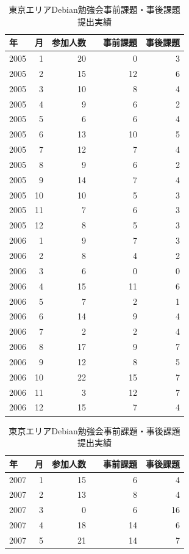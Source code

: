 \documentclass[mingoth,a4paper]{jsarticle}
\begin{document}
\begin{commandline}
\begin{table}[ht]
 \caption{東京エリアDebian勉強会事前課題・事後課題提出実績}\label{tab:attendandprepostwork}
\begin{minipage}{0.5\hsize}
\begin{tabular}{|l|r|r|r|r|}
 \hline
   年&月 & 参加人数 & 事前課題　& 事後課題 \\
 \hline
 2005 & 1 & 20 & 0 & 3 \\
 2005 & 2 & 15 & 12 & 6 \\
 2005 & 3 & 10 & 8 & 4 \\
 2005 & 4 & 9 & 6 & 2 \\
 2005 & 5 & 6 & 6 & 4\\
 2005 & 6 & 13 & 10 & 5\\
 2005 & 7 & 12 & 7 & 4\\
 2005 & 8 & 9 & 6 & 2\\
 2005 & 9 & 14 & 7 & 4\\
 2005 & 10 & 10 & 5 & 3\\
 2005 & 11 & 7 & 6 & 3\\
 2005 & 12 & 8 & 5 & 3\\
 2006 & 1 & 9 & 7 & 3\\
 2006 & 2 & 8 & 4 & 2\\
 2006 & 3 & 6 & 0 & 0\\
 2006 & 4 & 15 & 11 & 6\\
 2006 & 5 & 7 & 2 & 1\\
 2006 & 6 & 14 & 9 & 4\\
 2006 & 7 & 2 & 2 & 4\\
 2006 & 8 & 17 & 9 & 7\\
 2006 & 9 & 12 & 8 & 5\\
 2006 & 10 & 22 & 15 & 7\\
 2006 & 11 & 3 & 12 & 7\\
 2006 & 12 & 15 & 7 & 4\\
\end{tabular}
\end{minipage}
\begin{minipage}{0.5\hsize}
\begin{tabular}{|l|r|r|r|r|}
 \hline
   年&月 & 参加人数 & 事前課題　& 事後課題 \\
 \hline
 2007 & 1 & 15 & 6 & 4\\
 2007 & 2 & 13 & 8 & 4\\
 2007 & 3 & 0 & 6 & 16\\
 2007 & 4 & 18 & 14 & 6\\
 2007 & 5 & 21 & 14 & 7\\

\end{tabular}
\end{minipage}
\end{table}
\end{commandline}
\end{document}
